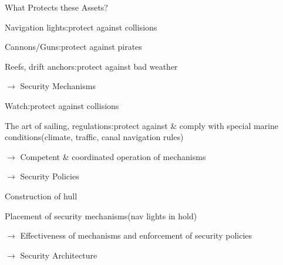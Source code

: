 \documentclass[a4paper]{article}
\begin{document}
\begin{multicols}{3}
    \begin{itemize*}
        \item What Protects these Assets?
              \begin{itemize*}
                  \item Navigation lights:protect against collisions
                  \item Cannons/Guns:protect against pirates
                  \item Reefs, drift anchors:protect against bad weather
              \end{itemize*}
        \item $\rightarrow$  Security Mechanisms
              \begin{itemize*}
                  \item Watch:protect against collisions
                  \item The art of sailing, regulations:protect against \& comply with special marine conditions(climate, traffic, canal navigation rules)
              \end{itemize*}
        \item $\rightarrow$  Competent \& coordinated operation of mechanisms
        \item $\rightarrow$  Security Policies
              \begin{itemize*}
                  \item Construction of hull
                  \item Placement of security mechanisms(nav lights in hold)
              \end{itemize*}
        \item $\rightarrow$  Effectiveness of mechanisms and enforcement of security policies
        \item $\rightarrow$  Security Architecture
    \end{itemize*}


\end{multicols}
\end{document}

